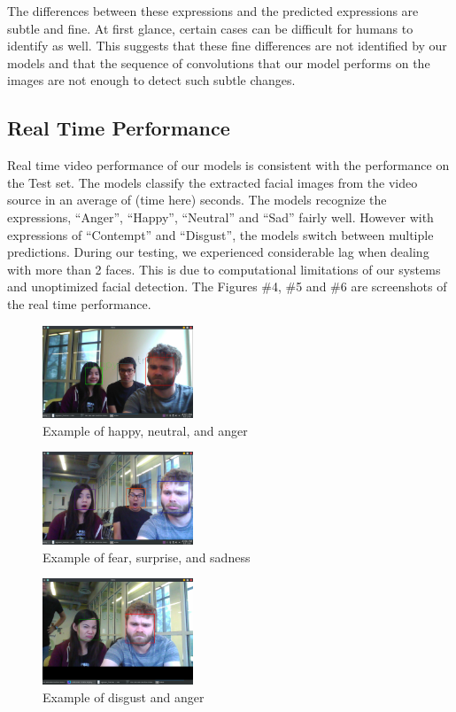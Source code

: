 \documentclass[10pt,twocolumn,letterpaper]{article}
\begin{document}
The differences between these expressions and the predicted expressions are subtle and fine. At first glance, certain cases can be difficult for humans to identify as well.
This suggests that these fine differences are not identified by our models and that the sequence of convolutions that our model performs on the images are not enough to detect such subtle changes.

\subsection{Real Time Performance}
Real time video performance of our models is consistent with the performance on the Test set. The models classify the extracted facial images from the video source in an average of (time here) seconds. The models recognize the expressions, “Anger”, “Happy”, “Neutral” and “Sad” fairly well. However with expressions of “Contempt” and “Disgust”, the models switch between multiple predictions. During our testing, we experienced considerable lag when dealing with more than 2 faces. This is due to computational limitations of our systems and unoptimized facial detection. The Figures \#4, \#5 and \#6 are screenshots of the real time performance.

\begin{figure}[ht]
\caption{Example of happy, neutral, and anger}
\centering
\includegraphics[width=0.4\textwidth]{happy_neutral_angry}
\end{figure}

\begin{figure}[ht]
\caption{Example of fear, surprise, and sadness}
\centering
\includegraphics[width=0.4\textwidth]{fear_surprise_sad}
\end{figure}

\begin{figure}[ht]
\caption{Example of disgust and anger}
\centering
\includegraphics[width=0.4\textwidth]{disgust_anger}
\end{figure}
\end{document}
